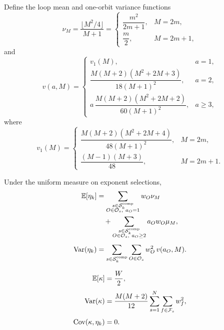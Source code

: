 Define the loop mean and one-orbit variance functions
\[
\nu_M=\frac{\lfloor M^2/4\rfloor}{M+1}
 =\begin{cases}
   \dfrac{m^2}{2m+1},&M=2m,\\[4pt] \dfrac{m}{2},&M=2m+1,
  \end{cases}
\]
and
{\small
\[
v(a,M)=
\begin{cases}
v_1(M), & a=1,\\[2pt]
\dfrac{M(M+2)(M^2+2M+3)}{18(M+1)^2}, & a=2,\\[6pt]
a\,\dfrac{M(M+2)(M^2+2M+2)}{60(M+1)^2}, & a\geq3,
\end{cases}
\]
}
where
{\small
\[
v_1(M)=
\begin{cases}
\dfrac{M(M+2)(M^2+2M+4)}{48(M+1)^2},&M=2m,\\[6pt]
\dfrac{(M-1)(M+3)}{48},&M=2m+1.
\end{cases}
\]
}

\begin{proposition}\label{prop:moments}
Under the uniform measure on exponent selections,
{\small
\[
\begin{aligned}
\mathbb{E}[\eta_k]
&=
\sum_{\substack{s\in\mathcal{S}_k^{\mathrm{comp}}\\[-2pt]
O\in\mathcal O_s,\ a_O=1}}
w_O\nu_M\\
&\quad+
\sum_{\substack{s\in\mathcal{S}_k^{\mathrm{comp}}\\[-2pt]
O\in\mathcal O_s,\ a_O\geq2}}
a_Ow_O\mu_M,\\[4pt]
\operatorname{Var}(\eta_k)
&=
\sum_{s\in\mathcal{S}_k^{\mathrm{comp}}}
\sum_{O\in\mathcal O_s}
w_O^2\,v(a_O,M).
\end{aligned}
\]
}

{\small
\[
\begin{aligned}
\mathbb{E}[\kappa]
&=\frac{W}{2},\\[3pt]
\operatorname{Var}(\kappa)
&=\frac{M(M+2)}{12}
\sum_{s=1}^{N}\sum_{f\in\mathcal F_s}w_f^2,\\[3pt]
\operatorname{Cov}(\kappa,\eta_k)
&=0.
\end{aligned}
\]
}
\end{proposition}


